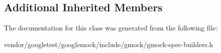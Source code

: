 \subsection*{Additional Inherited Members}


The documentation for this class was generated from the following file\+:\begin{DoxyCompactItemize}
\item 
vendor/googletest/googlemock/include/gmock/gmock-\/spec-\/builders.\+h\end{DoxyCompactItemize}
